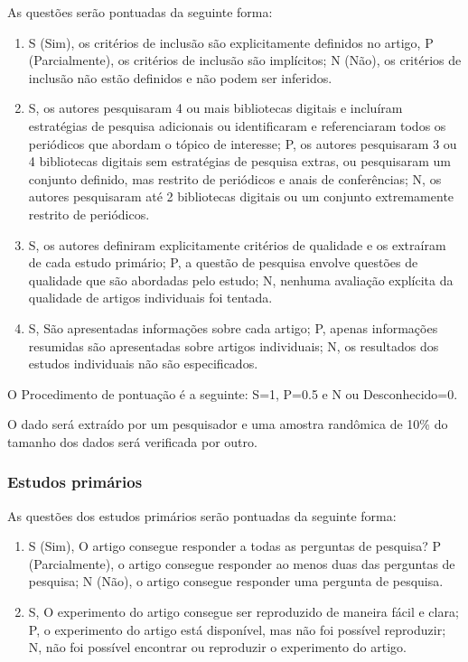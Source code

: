 As questões serão pontuadas da seguinte forma:

\begin{enumerate}[label=Questão \arabic*:]
\item S (Sim), os critérios de inclusão são explicitamente definidos no artigo, P (Parcialmente), os critérios de inclusão são implícitos; N (Não), os critérios de inclusão não estão definidos e não podem ser inferidos. 
\item S, os autores pesquisaram 4 ou mais bibliotecas digitais e incluíram estratégias de pesquisa adicionais ou identificaram e referenciaram todos os periódicos que abordam o tópico de interesse; P, os autores pesquisaram 3 ou 4 bibliotecas digitais sem estratégias de pesquisa extras, ou pesquisaram um conjunto definido, mas restrito de periódicos e anais de conferências; N, os autores pesquisaram até 2 bibliotecas digitais ou um conjunto extremamente restrito de periódicos. 
\item S, os autores definiram explicitamente critérios de qualidade e os extraíram de cada estudo primário; P, a questão de pesquisa envolve questões de qualidade que são abordadas pelo estudo; N, nenhuma avaliação explícita da qualidade de artigos individuais foi tentada.
\item S, São apresentadas informações sobre cada artigo; P, apenas informações resumidas são apresentadas sobre artigos individuais; N, os resultados dos estudos individuais não são especificados.
\end{enumerate}

O Procedimento de pontuação é a seguinte: S=1, P=0.5 e N ou Desconhecido=0. 

O dado será extraído por um pesquisador e uma amostra randômica de 10\% do tamanho dos dados será verificada por outro. 

\subsubsection{Estudos primários}

As questões dos estudos primários serão pontuadas da seguinte forma:

\begin{enumerate}[label=Questão \arabic*:]
\item S (Sim), O artigo consegue responder a todas as perguntas de pesquisa? P (Parcialmente), o artigo consegue responder ao menos duas das perguntas de pesquisa; N (Não), o artigo consegue responder uma pergunta de pesquisa. 
\item S, O experimento do artigo consegue ser reproduzido de maneira fácil e clara; P, o experimento do artigo está disponível, mas não foi possível reproduzir; N, não foi possível encontrar ou reproduzir o experimento do artigo.
\end{enumerate}

